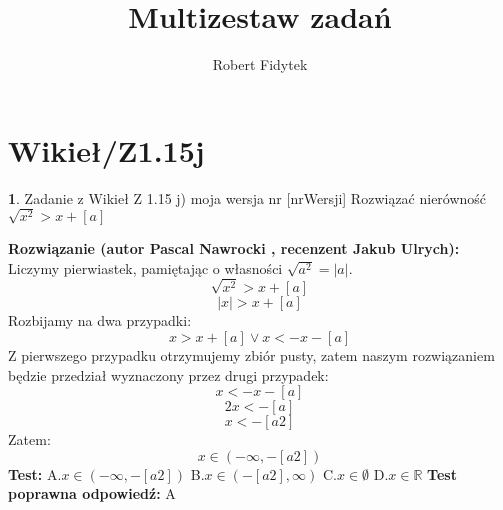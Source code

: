 \documentclass[12pt, a4paper]{article}
\title{Multizestaw zadań}
\author{Robert Fidytek}
\date{}
\theoremstyle{definition} %
\newtheorem{zad}{}
\newcommand{\kategoria}[1]{\section{#1}} %
\newcommand{\zadStart}[1]{\begin{zad}#1\newline} %
\newcommand{\zadStop}{\end{zad}}   %
\newcommand{\rozwStart}[2]{\noindent \textbf{Rozwiązanie (autor #1 , recenzent #2): }\newline} %
\newcommand{\odpStop}{\newline}                                             %
\newcommand{\testStart}{\noindent \textbf{Test:}\newline} %
\newcommand{\testStop}{\newline} %
\newcommand{\kluczStart}{\noindent \textbf{Test poprawna odpowiedź:}\newline} %
\newcommand{\kluczStop}{\newline} %
\begin{document}
\maketitle



\kategoria{Wikieł/Z1.15j}
\zadStart{Zadanie z Wikieł Z 1.15 j) moja wersja nr [nrWersji]}
Rozwiązać nierówność $\sqrt{x^2}>x+[a]$
\zadStop
\rozwStart{Pascal Nawrocki}{Jakub Ulrych}
Liczymy pierwiastek, pamiętając o własności $\sqrt{a^2}=|a|$.
$$\sqrt{x^2}>x+[a]$$
$$|x|>x+[a]$$
Rozbijamy na dwa przypadki:
$$x>x+[a] \vee x<-x-[a]$$
Z pierwszego przypadku otrzymujemy zbiór pusty, zatem naszym rozwiązaniem będzie przedział wyznaczony przez drugi przypadek:
$$x<-x-[a]$$
$$2x<-[a]$$
$$x<-[a2]$$
Zatem:
$$x\in(-\infty,-[a2])$$
\odpStop
\testStart
A.$x\in(-\infty,-[a2])$
B.$x\in(-[a2],\infty)$
C.$x\in\emptyset$
D.$x\in\mathbb{R}$
\testStop
\kluczStart
A
\kluczStop
\end{document}
